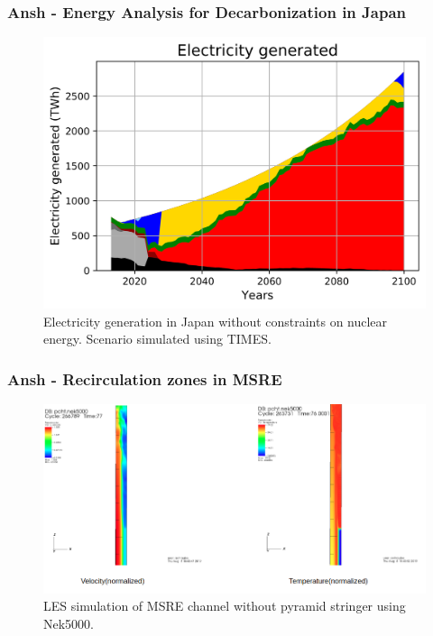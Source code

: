 \begin{frame}
	\frametitle{Ansh - Energy Analysis for Decarbonization in Japan}
  \begin{figure}[htbp!]
    \begin{center}
      \includegraphics[scale=0.5]{./images/conv_nuc_elc}
    \end{center}
          \caption{Electricity generation in Japan without constraints on nuclear energy. Scenario simulated using TIMES.}
    \label{s1e}
  \end{figure}

\end{frame}

\begin{frame}
	\frametitle{Ansh - Recirculation zones in MSRE}
  \begin{figure}[htbp!]
    \begin{center}
      \includegraphics[scale=0.35]{./images/msre-flat}
    \end{center}
          \caption{LES simulation of MSRE channel without pyramid stringer using Nek5000.}
    \label{s1e}
  \end{figure}

\end{frame}
